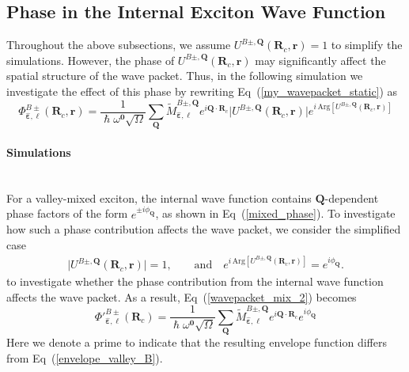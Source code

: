 \vfill
\subsection{Phase in the Internal Exciton Wave Function}

Throughout the above subsections, we assume $U^{B\pm,\boldsymbol{Q}} (\boldsymbol{R}_c,\boldsymbol{r})=1$ to simplify the simulations. However, the phase of $U^{B\pm,\boldsymbol{Q}} (\boldsymbol{R}_c,\boldsymbol{r})$ may significantly affect the spatial structure of the wave packet. Thus, in the following simulation we investigate the effect of this phase by rewriting Eq~(\ref{my_wavepacket_static}) as
\begin{equation}
\Phi^{B\pm}_{\hat{\boldsymbol{\varepsilon}}, \ell}(\boldsymbol{R}_c, \boldsymbol{r})
=
\frac{1}{\hslash \omega^{\boldsymbol{0}} \sqrt{\Omega}}
\sum_{\boldsymbol{Q}}
\tilde{M}_{\hat{\boldsymbol{\varepsilon}}, \ell}^{B\pm,\boldsymbol{Q}}
e^{i\boldsymbol{Q}\cdot\boldsymbol{R}_c}
\bigl|U^{B\pm,\boldsymbol{Q}} (\boldsymbol{R}_c,\boldsymbol{r})\bigr|
e^{i\,\mathrm{Arg}\left[U^{B\pm,\boldsymbol{Q}} (\boldsymbol{R}_c,\boldsymbol{r})\right]}
\label{wavepacket_mix_2}
\end{equation}

\paragraph*{Simulations}~\\
For a valley-mixed exciton, the internal wave function contains $\boldsymbol{Q}$-dependent phase factors of the form $e^{\pm i \phi_{\boldsymbol{Q}}}$, as shown in Eq~(\ref{mixed_phase}). To investigate how such a phase contribution affects the wave packet, we consider the simplified case
\begin{equation}
\begin{aligned}
\bigl|U^{B\pm,\boldsymbol{Q}} (\boldsymbol{R}_c,\boldsymbol{r})\bigr| = 1, 
\qquad \text{and} \quad
e^{i\,\mathrm{Arg}\left[U^{B\pm,\boldsymbol{Q}} (\boldsymbol{R}_c,\boldsymbol{r})\right]} = e^{i \phi_{\boldsymbol{Q}}}.
\end{aligned}
\label{wavepacket_mix_3}
\end{equation}
to investigate whether the phase contribution from the internal wave function affects the wave packet. As a result, Eq~(\ref{wavepacket_mix_2}) becomes
\begin{equation}
{\Phi'}^{B\pm}_{\hat{\boldsymbol{\varepsilon}}, \ell}(\boldsymbol{R}_c)
=
\frac{1}{\hslash \omega^{\boldsymbol{0}} \sqrt{\Omega}}
\sum_{\boldsymbol{Q}}
\tilde{M}_{\hat{\boldsymbol{\varepsilon}}, \ell}^{B\pm,\boldsymbol{Q}}
e^{i\boldsymbol{Q}\cdot\boldsymbol{R}_c}
e^{i \phi_{\boldsymbol{Q}}}
\end{equation}
Here we denote a prime to indicate that the resulting envelope function differs from Eq~(\ref{envelope_valley_B}).

